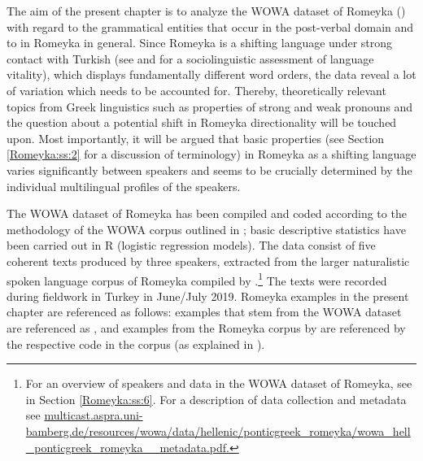 \documentclass[output=paper,colorlinks,citecolor=brown]{langscibook}
\begin{document}
The aim of the present chapter is to analyze the WOWA dataset of Romeyka (\citealt{schreiber2021pontic}) with regard to the grammatical entities that occur in the post-verbal domain and to  in Romeyka in general. Since Romeyka is a shifting language under strong contact with Turkish (see \citealt{schreiber2016assessing} and \citealt{schreiberSitaridou2017assessing} for a sociolinguistic assessment of language vitality), which displays fundamentally different word orders, the data reveal a lot of variation which needs to be accounted for. Thereby, theoretically relevant topics from Greek linguistics such as  properties of strong and weak pronouns and the question about a potential shift in Romeyka  directionality will be touched upon. Most importantly, it will be argued that basic  properties (see Section \ref{Romeyka:ss:2} for a discussion of terminology) in Romeyka as a shifting language varies significantly between speakers and seems to be crucially determined by the individual multilingual profiles of the speakers.

\begin{sloppypar}
The WOWA dataset of Romeyka has been compiled and coded according to the methodology of the WOWA corpus outlined in ; basic descriptive statistics have been carried out in R (logistic regression models). The data consist of five coherent texts produced by three speakers, extracted from the larger naturalistic spoken language corpus of Romeyka compiled by \citet{schreiber_inprep}.\footnote{For an overview of speakers and data in the WOWA dataset of Romeyka, see  in Section \ref{Romeyka:ss:6}. For a description of data collection and metadata see \url{multicast.aspra.uni-bamberg.de/resources/wowa/data/hellenic/ponticgreek_romeyka/wowa_hell_ponticgreek_romeyka__metadata.pdf.}} The texts were recorded during fieldwork in Turkey in June/July 2019. Romeyka examples in the present chapter are referenced as follows: examples that stem from the WOWA dataset are referenced as \citet[text ID, token ID]{schreiber2021pontic}, and examples from the Romeyka corpus by \citet{schreiber_inprep} are referenced by the respective code in the corpus (as explained in \citealt{schreibergrammar2022}).
\end{sloppypar}
\end{document}

